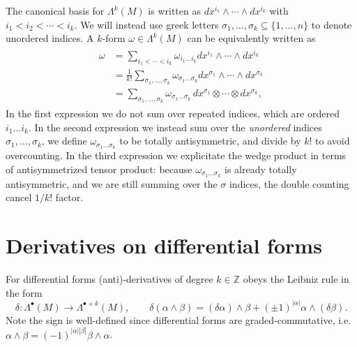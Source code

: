 \documentclass[../geometry_main.tex]{subfiles}
\begin{document}
\begin{mytheorem}
The canonical basis for $\Lambda^k(M)$ is written as $dx^{i_1} \wedge \cdots \wedge dx^{i_k}$ with $i_1 < i_2 < \cdots < i_k$.
We will instead use greek letters $\sigma_1, \dots, \sigma_k \subseteq \{1, \dots, n\}$ to denote unordered indices.
A $k$-form $\omega \in \Lambda^k (M)$ can be equivalently written  as
{\small\begin{align}\label{eq:indices_bookkeeping_differential_forms}
\begin{aligned}
    \omega &= \sum_{i_1 < \cdots < i_k} \omega_{i_1 \dots i_k} dx^{i_1} \wedge \cdots \wedge dx^{i_k}
    \\
    &= \frac{1}{k!} \sum_{\sigma_1, \dots, \sigma_k} \omega_{\sigma_1 \dots \sigma_k} dx^{\sigma_1} \wedge \cdots \wedge dx^{\sigma_k}
    \\
    &= \sum_{\sigma_1, \dots, \sigma_k} \omega_{\sigma_1 \dots \sigma_k}\, dx^{\sigma_1} \otimes \cdots \otimes dx^{\sigma_k},
\end{aligned}
\end{align}}
In the first expression we do not sum over repeated indices, which are ordered $i_1 \dots i_k$.
In the second expression we instead sum over the \emph{unordered} indices $\sigma_1, \dots, \sigma_k$, we define $\omega_{\sigma_1 \dots \sigma_k}$ to be totally antisymmetric, and divide by $k!$ to avoid overcounting.
In the third expression we explicitate the wedge product in terms of antisymmetrized tensor product: because $\omega_{\sigma_1 \dots \sigma_k}$ is already totally antisymmetric, and we are still summing over the $\sigma$ indices, the double counting cancel $1/k!$ factor.
\end{mytheorem}


\section{Derivatives on differential forms}

\noindent
For differential forms (anti)-derivatives of degree $k\in \mathbb{Z}$ obeys the Leibniz rule in the form
\begin{equation}
    \delta: \Lambda^\bullet (M) \to \Lambda^{\bullet+k} (M), \qquad \delta (\alpha \wedge \beta) = (\delta \alpha) \wedge \beta + (\pm1)^{|\alpha|} \alpha \wedge (\delta \beta).
\end{equation}
Note the sign is well-defined since differential forms are graded-commutative, i.e. $\alpha \wedge \beta = (-1)^{|\alpha||\beta|} \beta \wedge \alpha$.
\end{document}
